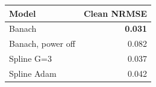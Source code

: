 \begin{tabular}{lr}
\toprule
Model & Clean NRMSE \\
\midrule
Banach & \textbf{0.031} \\
Banach, power off & 0.082 \\
Spline G=3 & 0.037 \\
Spline Adam & 0.042 \\
\bottomrule
\end{tabular}
